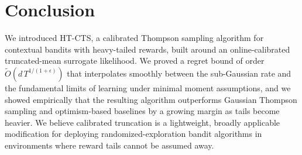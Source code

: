 \section{Conclusion}
We introduced HT-CTS, a calibrated Thompson sampling algorithm for contextual bandits with heavy-tailed rewards, built around an online-calibrated truncated-mean surrogate likelihood. We proved a regret bound of order $\widetilde{O}(d\,T^{1/(1+\epsilon)})$ that interpolates smoothly between the sub-Gaussian rate and the fundamental limits of learning under minimal moment assumptions, and we showed empirically that the resulting algorithm outperforms Gaussian Thompson sampling and optimism-based baselines by a growing margin as tails become heavier. We believe calibrated truncation is a lightweight, broadly applicable modification for deploying randomized-exploration bandit algorithms in environments where reward tails cannot be assumed away.



